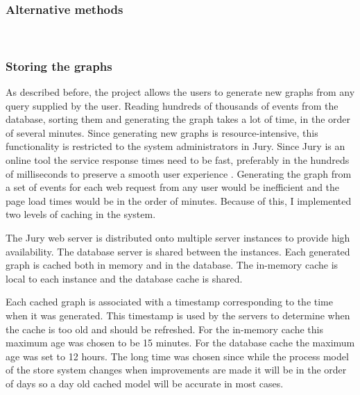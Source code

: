 \subsubsection{Alternative methods}
\\

\subsubsection{Storing the graphs}
\label{storinggraphs}

As described before, the project allows the users to generate new graphs from any query supplied by the user.
Reading hundreds of thousands of events from the database, sorting them and generating the graph takes a lot of time, in the order of several minutes.
Since generating new graphs is resource-intensive, this functionality is restricted to the system administrators in Jury. 
Since Jury is an online tool the service response times need to be fast, preferably in the hundreds of milliseconds to preserve a smooth user experience .
Generating the graph from a set of events for each web request from any user would be inefficient and the page load times would be in the order of minutes.
Because of this, I implemented two levels of caching in the system.

The Jury web server is distributed onto multiple server instances to provide high availability. The database server is shared between the instances.
Each generated graph is cached both in memory and in the database.
The in-memory cache is local to each instance and the database cache is shared.

Each cached graph is associated with a timestamp corresponding to the time when it was generated. 
This timestamp is used by the servers to determine when the cache is too old and should be refreshed.
For the in-memory cache this maximum age was chosen to be 15 minutes.
For the database cache the maximum age was set to 12 hours.
The long time was chosen since while the process model of the store system changes when improvements are made it will be in the order of days so a day old cached model will be accurate in most cases.

